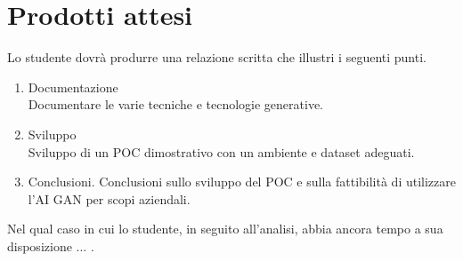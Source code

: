 \section*{Prodotti attesi}
Lo studente dovrà produrre una relazione scritta che illustri i seguenti punti.
\begin{enumerate}
    \item Documentazione \\
          Documentare le varie tecniche e tecnologie generative.

    \item Sviluppo \\
          Sviluppo di un POC dimostrativo con un ambiente e dataset adeguati.

    \item Conclusioni.
          Conclusioni sullo sviluppo del POC e sulla fattibilità di
          utilizzare l'AI GAN per scopi aziendali.
\end{enumerate}

Nel qual caso in cui lo studente, in seguito all'analisi, abbia ancora tempo a sua disposizione ... .
